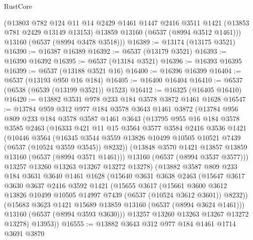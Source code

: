 \begin{lexlean}{RustCore}
\begin{coremodule}
      (@13803
        @782
        @124
        @11
        @14
        @2429
        @1461
        @1447
        @2416
        @3511
        @1421
        (@13853 @781 @2429 @13149 @13153)
        @13859
        @13160
        (@6537 (@8994 @3512 @1461)))
      @13160
      (@6537 (@8994 @3478 @3518)))
@16389 := @13174 (@13175 @3521)
@16390 := @16387 @16389
@16392 := @6537 (@13179 @3521)
@16393 := @16390 @16392
@16395 := @6537 (@13184 @3521)
@16396 := @16393 @16395
@16399 := @6537 (@13188 @3521 @16)
@16400 := @16396 @16399
@16404 := @6537 (@13193 @950 @16 @184)
@16405 := @16400 @16404
@16410 := @6537 (@6538 (@6539 (@13199 @3521)) @1523)
@16412 := @16325 (@16405 @16410)
@16420 := @13882 @3531 @978 @233 @184 @3578 @3872 @1461 @1628
@16547 := @13784
    @959
    @312
    @977
    @184
    @3578
    @3643
    @1461
    @3872
    (@13784
      @956
      @809
      @233
      @184
      @3578
      @3587
      @1461
      @3643
      (@13795
        @955
        @16
        @184
        @3578
        @3585
        @2463
        (@16333
          @421
          @11
          @15
          @3564
          @3577
          @3584
          @2416
          @3536
          @1421
          (@10446
            @3564
            (@16345
              @3544
              @3559
              @13826
              @10499
              @10505
              @10521
              @7439
              (@6537 (@10524 @3559 @3545))
              @8232))
          (@13848 @3570 @1421 @13857 @13859 @13160 (@6537 (@8994 @3571 @1461)))
          @13160
          (@6537 (@8994 @3537 @3577)))
        @13257
        @13260
        @13263
        @13267
        @13272
        @13278)
      (@13882
        @3587
        @809
        @233
        @184
        @3631
        @3640
        @1461
        @1628
        (@15640
          @3631
          @3638
          @2463
          (@15647
            @3617
            @3630
            @3637
            @2416
            @3592
            @1421
            (@15655
              @3617
              (@15661
                @3600
                @3612
                @13826
                @10499
                @10505
                @14997
                @7439
                (@6537 (@10524 @3612 @3601))
                @8232))
            (@15683 @3623 @1421 @15689 @13859 @13160 (@6537 (@8994 @3624 @1461)))
            @13160
            (@6537 (@8994 @3593 @3630)))
          @13257
          @13260
          @13263
          @13267
          @13272
          @13278)
        @13953))
@16555 := @13882 @3643 @312 @977 @184 @1461 @1714 @3691 @3870

\end{coremodule}
\end{lexlean}
